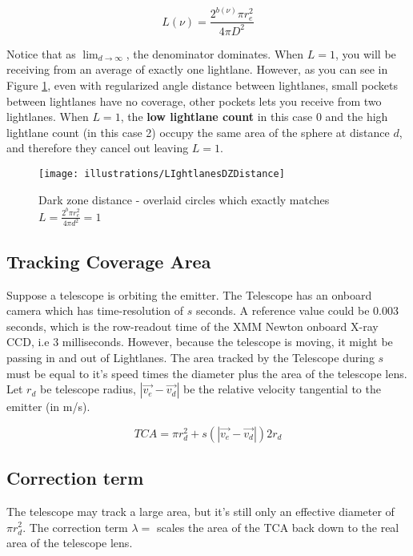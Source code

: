 \documentclass[notitlepage]{article}
\begin{document}
\begin{equation}
L(\nu) = \frac{2^{b(\nu)} \pi r_e^2}{4\pi D^2}
\label{eq:L}
\end{equation}

Notice that as $\lim_{d \rightarrow \infty}$, the denominator dominates. When $L = 1$, you will be receiving from an average of exactly one lightlane.  However, as you can see in Figure \ref{fig:darkZoneDistance}, even with regularized angle distance between lightlanes, small pockets between lightlanes have no coverage, other pockets lets you receive from two lightlanes. When $L=1$, the \textbf{low lightlane count} in this case 0 and the high lightlane count (in this case 2) occupy the same area of the sphere at distance $d$, and therefore they cancel out leaving $L =1$.

\begin{figure}
\centering
{\texttt{[image: illustrations/LIghtlanesDZDistance]}}
\caption{Dark zone distance - overlaid circles which exactly matches $L = \frac{2^b \pi r_e^2}{4\pi d^2} = 1$}
\label{fig:darkZoneDistance}
\end{figure}

\subsection{Tracking Coverage Area}
Suppose a telescope is orbiting the emitter. The Telescope has an onboard camera which has time-resolution  of $s$ seconds. A reference value could be $0.003$ seconds, which is the row-readout time of the XMM Newton onboard X-ray CCD, i.e $3$ milliseconds. However, because the telescope is moving, it might be passing in and out of Lightlanes. The area tracked by the Telescope during $s$ must be equal to it's speed times the diameter plus the area of the telescope lens. Let $r_d$ be telescope radius, $| \vec{v_e} - \vec{v_d} |$  be the relative velocity tangential to the emitter (in m/s).

\begin{equation}
TCA = \pi r_d^2 + s (| \vec{v_e}-\vec{v_d} |) 2r_d 
\label{eq:TCA}
\end{equation}



\subsection{Correction term}
The telescope may track a large area, but it's still only an effective diameter of $\pi r_d^2$. The correction term $\lambda = $ scales the area of the TCA back down to the real area of the telescope lens. 
\end{document}
